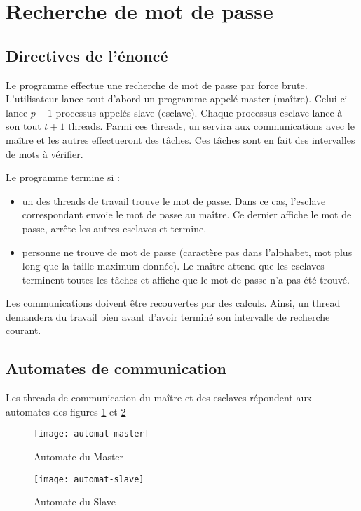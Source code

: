 \section{Recherche de mot de passe} %
\label{sec:recherche_de_mot_de_passe}

\subsection{Directives de l'énoncé} %
\label{sub:enonce}

Le programme effectue une recherche de mot de passe par force brute. L'utilisateur lance tout d'abord un programme appelé master (maître). Celui-ci lance $p-1$ processus appelés slave (esclave). Chaque processus esclave lance à son tout $t+1$ threads. Parmi ces threads, un servira aux communications avec le maître et les autres effectueront des tâches. Ces tâches sont en fait des intervalles de mots à vérifier. 

Le programme termine si :
\begin{itemize}
	\item un des threads de travail trouve le mot de passe. Dans ce cas, l'esclave correspondant envoie le mot de passe au maître. Ce dernier affiche le mot de passe, arrête les autres esclaves et termine.
	\item personne ne trouve de mot de passe (caractère pas dans l'alphabet, mot plus long que la taille maximum donnée). Le maître attend que les esclaves terminent toutes les tâches et affiche que le mot de passe n'a pas été trouvé.
\end{itemize}

Les communications doivent être recouvertes par des calculs. Ainsi, un thread demandera du travail bien avant d'avoir terminé son intervalle de recherche courant.

\subsection{Automates de communication} %
\label{sub:automates_de_communication}

Les threads de communication du maître et des esclaves répondent aux automates des figures \ref{fig:master} et \ref{fig:slave}

\begin{figure}[h!]
\centering
\texttt{[image: automat-master]}
\caption{Automate du Master}
\label{fig:master}
\end{figure}


\begin{figure}[h!]
\centering
\texttt{[image: automat-slave]}
\caption{Automate du Slave}
\label{fig:slave}
\end{figure}

